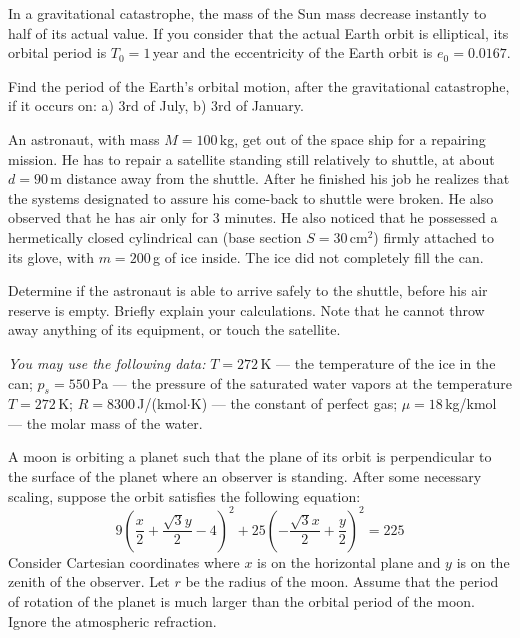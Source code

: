 
In a gravitational catastrophe, the mass of the Sun mass decrease instantly to
half of its actual value. If you consider that the actual Earth orbit is
elliptical, its orbital period is $T_0 = 1$\,year and the eccentricity of the
Earth orbit is $e_0 = 0.0167$.

Find the period of the Earth's orbital motion, after the gravitational
catastrophe, if it occurs on: a) 3rd of July, b) 3rd of January.

An astronaut, with mass $M = 100$\,kg, get out of the space ship for a
repairing mission. He has to repair a satellite standing still relatively to
shuttle, at about $d = 90$\,m distance away from the shuttle. After he finished
his job he realizes that the systems designated to assure his come-back to
shuttle were broken. He also observed that he has air only for 3 minutes. He
also noticed that he possessed a hermetically closed cylindrical can (base
section $S = 30\,\mathrm{cm}^2$) firmly attached to its glove, with
$m = 200$\,g of ice inside. The ice did not completely fill the can.

Determine if the astronaut is able to arrive safely to the shuttle, before his
air reserve is empty. Briefly explain your calculations. Note that he cannot
throw away anything of its equipment, or touch the satellite.

\emph{You may use the following data:} $T = 272$\,K --- the temperature of the
ice in the can; $p_s = 550$\,Pa --- the pressure of the saturated water vapors
at the temperature $T = 272$\,K; $R = 8300$\,J/(kmol$\cdot$K) --- the constant
of perfect gas; $\mu = 18$\,kg/kmol --- the molar mass of the water.

A moon is orbiting a planet such that the plane of its orbit is perpendicular
to the surface of the planet where an observer is standing. After some
necessary scaling, suppose the orbit satisfies the following equation:
\[ 9\left(\frac{x}{2} + \frac{\sqrt{3}y}{2} - 4\right)^2
   + 25\left(-\frac{\sqrt{3}x}{2} + \frac{y}{2}\right)^2 = 225 \]
Consider Cartesian coordinates where $x$ is on the horizontal plane and $y$ is
on the zenith of the observer. Let $r$ be the radius of the moon. Assume that
the period of rotation of the planet is much larger than the orbital period of
the moon. Ignore the atmospheric refraction.

